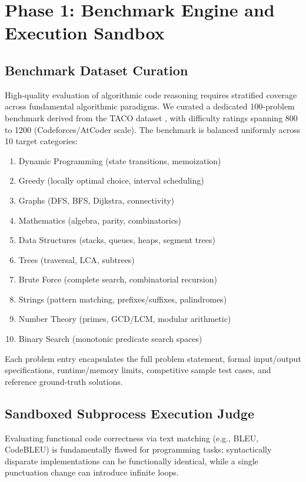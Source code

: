 \documentclass[lettersize,journal]{IEEEtran}
\begin{document}
\section{Phase 1: Benchmark Engine and Execution Sandbox}
\subsection{Benchmark Dataset Curation}
High-quality evaluation of algorithmic code reasoning requires stratified coverage across fundamental algorithmic paradigms. We curated a dedicated 100-problem benchmark derived from the TACO dataset \cite{li2023taco}, with difficulty ratings spanning 800 to 1200 (Codeforces/AtCoder scale). The benchmark is balanced uniformly across 10 target categories:
\begin{enumerate}
    \item Dynamic Programming (state transitions, memoization)
    \item Greedy (locally optimal choice, interval scheduling)
    \item Graphs (DFS, BFS, Dijkstra, connectivity)
    \item Mathematics (algebra, parity, combinatorics)
    \item Data Structures (stacks, queues, heaps, segment trees)
    \item Trees (traversal, LCA, subtrees)
    \item Brute Force (complete search, combinatorial recursion)
    \item Strings (pattern matching, prefixes/suffixes, palindromes)
    \item Number Theory (primes, GCD/LCM, modular arithmetic)
    \item Binary Search (monotonic predicate search spaces)
\end{enumerate}

Each problem entry encapsulates the full problem statement, formal input/output specifications, runtime/memory limits, competitive sample test cases, and reference ground-truth solutions.

\subsection{Sandboxed Subprocess Execution Judge}
Evaluating functional code correctness via text matching (e.g., BLEU, CodeBLEU) is fundamentally flawed for programming tasks; syntactically disparate implementations can be functionally identical, while a single punctuation change can introduce infinite loops.
\end{document}
